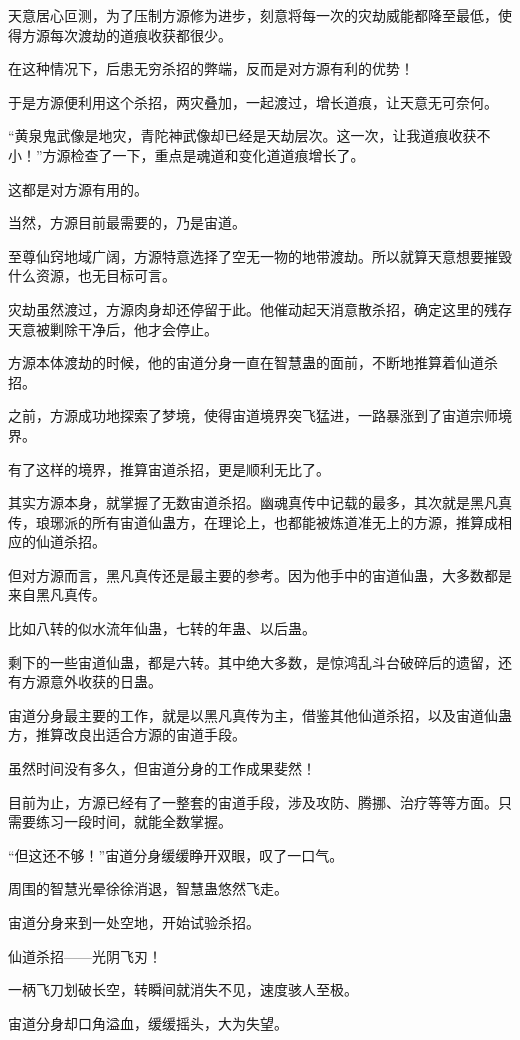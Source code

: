 \begin{this_body}
天意居心叵测，为了压制方源修为进步，刻意将每一次的灾劫威能都降至最低，使得方源每次渡劫的道痕收获都很少。

在这种情况下，后患无穷杀招的弊端，反而是对方源有利的优势！

于是方源便利用这个杀招，两灾叠加，一起渡过，增长道痕，让天意无可奈何。

“黄泉鬼武像是地灾，青陀神武像却已经是天劫层次。这一次，让我道痕收获不小！”方源检查了一下，重点是魂道和变化道道痕增长了。

这都是对方源有用的。

当然，方源目前最需要的，乃是宙道。

至尊仙窍地域广阔，方源特意选择了空无一物的地带渡劫。所以就算天意想要摧毁什么资源，也无目标可言。

灾劫虽然渡过，方源肉身却还停留于此。他催动起天消意散杀招，确定这里的残存天意被剿除干净后，他才会停止。

方源本体渡劫的时候，他的宙道分身一直在智慧蛊的面前，不断地推算着仙道杀招。

之前，方源成功地探索了梦境，使得宙道境界突飞猛进，一路暴涨到了宙道宗师境界。

有了这样的境界，推算宙道杀招，更是顺利无比了。

其实方源本身，就掌握了无数宙道杀招。幽魂真传中记载的最多，其次就是黑凡真传，琅琊派的所有宙道仙蛊方，在理论上，也都能被炼道准无上的方源，推算成相应的仙道杀招。

但对方源而言，黑凡真传还是最主要的参考。因为他手中的宙道仙蛊，大多数都是来自黑凡真传。

比如八转的似水流年仙蛊，七转的年蛊、以后蛊。

剩下的一些宙道仙蛊，都是六转。其中绝大多数，是惊鸿乱斗台破碎后的遗留，还有方源意外收获的日蛊。

宙道分身最主要的工作，就是以黑凡真传为主，借鉴其他仙道杀招，以及宙道仙蛊方，推算改良出适合方源的宙道手段。

虽然时间没有多久，但宙道分身的工作成果斐然！

目前为止，方源已经有了一整套的宙道手段，涉及攻防、腾挪、治疗等等方面。只需要练习一段时间，就能全数掌握。

“但这还不够！”宙道分身缓缓睁开双眼，叹了一口气。

周围的智慧光晕徐徐消退，智慧蛊悠然飞走。

宙道分身来到一处空地，开始试验杀招。

仙道杀招——光阴飞刃！

一柄飞刀划破长空，转瞬间就消失不见，速度骇人至极。

宙道分身却口角溢血，缓缓摇头，大为失望。


\end{this_body}
